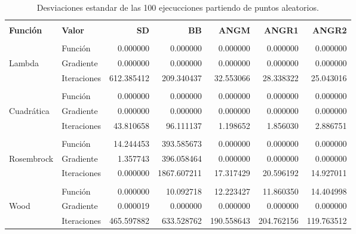 \begin{table}[H]
    \changefontsizes{11pt}
    \centering
    \begin{tabular}{llrrrrr}
        \hline                                                                                                          \\
        \textbf{Función} & \textbf{Valor} & \textbf{SD} & \textbf{BB} & \textbf{ANGM} & \textbf{ANGR1} & \textbf{ANGR2} \\[0.1cm]\hline
        \\
                         & Función        & 0.000000    & 0.000000    & 0.000000      & 0.000000       & 0.000000       \\[0.25cm]
        Lambda           & Gradiente      & 0.000000    & 0.000000    & 0.000000      & 0.000000       & 0.000000       \\[0.25cm]
                         & Iteraciones    & 612.385412  & 209.340437  & 32.553066     & 28.338322      & 25.043016      \\[0.25cm]\hline
        \\
                         & Función        & 0.000000    & 0.000000    & 0.000000      & 0.000000       & 0.000000       \\[0.25cm]
        Cuadrática       & Gradiente      & 0.000000    & 0.000000    & 0.000000      & 0.000000       & 0.000000       \\[0.25cm]
                         & Iteraciones    & 43.810658   & 96.111137   & 1.198652      & 1.856030       & 2.886751       \\[0.25cm]\hline
        \\
                         & Función        & 14.244453   & 393.585673  & 0.000000      & 0.000000       & 0.000000       \\[0.25cm]
        Rosembrock       & Gradiente      & 1.357743    & 396.058464  & 0.000000      & 0.000000       & 0.000000       \\[0.25cm]
                         & Iteraciones    & 0.000000    & 1867.607211 & 17.317429     & 20.596192      & 14.927011      \\[0.25cm]\hline
        \\
                         & Función        & 0.000000    & 10.092718   & 12.223427     & 11.860350      & 14.404998      \\[0.25cm]
        Wood             & Gradiente      & 0.000019    & 0.000000    & 0.000000      & 0.000000       & 0.000000       \\[0.25cm]
                         & Iteraciones    & 465.597882  & 633.528762  & 190.558643    & 204.762156     & 119.763512     \\[0.25cm]\hline
    \end{tabular}
    \caption{Desviaciones estandar de las 100 ejecucciones partiendo de puntos aleatorios.}
\end{table}